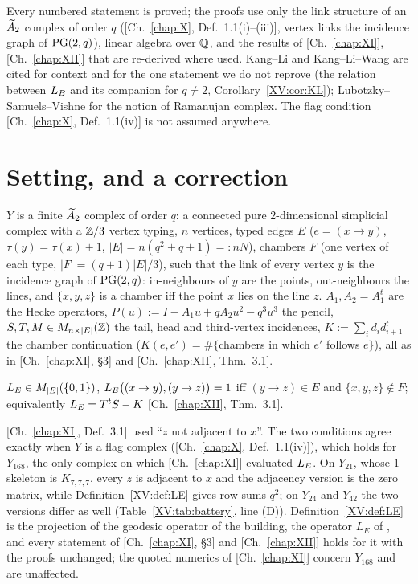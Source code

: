 Every numbered statement is proved; the proofs use only the link structure of an $\widetilde A_2$
complex of order $q$ ([Ch.~\ref{chap:X}, Def.~1.1(i)--(iii)], vertex links the incidence graph of
$\mathrm{PG}(2,q)$), linear algebra over $\mathbb{Q}$, and the results of [Ch.~\ref{chap:XI}], [Ch.~\ref{chap:XII}] that are re-derived where
used. Kang--Li \cite{KL} and Kang--Li--Wang \cite{KLW} are cited for context and for the
one statement we do not reprove (the relation between $L_B$ and its companion for $q\ne2$,
Corollary~\ref{XV:cor:KL}); Lubotzky--Samuels--Vishne \cite{LSV} for the notion of Ramanujan
complex. The flag condition [Ch.~\ref{chap:X}, Def.~1.1(iv)] is not assumed anywhere.

\section{Setting, and a correction}\label{XV:sec:setting}

$Y$ is a finite $\widetilde A_2$ complex of order $q$: a connected pure $2$-dimensional simplicial
complex with a $\mathbb{Z}/3$ vertex typing, $n$ vertices, typed edges $E$ ($e=(x\to y)$,
$\tau(y)=\tau(x)+1$, $|E|=n(q^{2}+q+1)=:nN$), chambers $F$ (one vertex of each type,
$|F|=(q{+}1)|E|/3$), such that the link of every vertex $y$ is the incidence graph of
$\mathrm{PG}(2,q)$: in-neighbours of $y$ are the points, out-neighbours the lines, and $\{x,y,z\}$ is a
chamber iff the point $x$ lies on the line $z$. $A_1,A_2=A_1^{t}$ are the Hecke operators,
$P(u):=I-A_1u+qA_2u^{2}-q^{3}u^{3}$ the pencil, $S,T,M\in M_{n\times|E|}(\mathbb{Z})$ the tail, head and
third-vertex incidences, $K:=\sum_id_id_{i+1}^{t}$ the chamber continuation
($K(e,e')=\#\{$chambers in which $e'$ follows $e\}$), all as in [Ch.~\ref{chap:XI}, \S3] and [Ch.~\ref{chap:XII}, Thm.~3.1].

\begin{definition}\label{XV:def:LE}
$L_E\in M_{|E|}(\{0,1\})$, $L_E\bigl((x\to y),(y\to z)\bigr)=1$ iff $(y\to z)\in E$ and
$\{x,y,z\}\notin F$; equivalently $L_E=T^{t}S-K$ [Ch.~\ref{chap:XII}, Thm.~3.1].
\end{definition}

\begin{remark}\label{XV:rem:corrXI}
[Ch.~\ref{chap:XI}, Def.~3.1] used ``$z$ not adjacent to $x$''. The two conditions agree exactly when $Y$ is
a flag complex ([Ch.~\ref{chap:X}, Def.~1.1(iv)]), which holds for $Y_{168}$, the only complex on which [Ch.~\ref{chap:XI}]
evaluated $L_E$. On $Y_{21}$, whose $1$-skeleton is $K_{7,7,7}$, every $z$ is adjacent to $x$
and the adjacency version is the zero matrix, while Definition~\ref{XV:def:LE} gives row sums
$q^{2}$; on $Y_{24}$ and $Y_{42}$ the two versions differ as well (Table~\ref{XV:tab:battery},
line (D)). Definition~\ref{XV:def:LE} is the projection of the geodesic operator of the
building, the operator $L_E$ of \cite{KL}, and every statement of [Ch.~\ref{chap:XI}, \S3] and [Ch.~\ref{chap:XII}] holds
for it with the proofs unchanged; the quoted numerics of [Ch.~\ref{chap:XI}] concern $Y_{168}$ and are
unaffected.
\end{remark}

